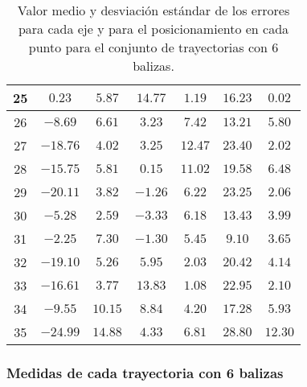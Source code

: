 \begin{table}[H]
\begin{tabular}{|c|c|c|c|c|c|c|}
                        25  & $0.23$    &  $5.87$   &  $14.77$   &  $1.19$   & $16.23$  &  $0.02$   \\ \hline
                        26  & $-8.69$   &  $6.61$   &  $3.23$    &  $7.42$   & $13.21$  &  $5.80$   \\ \hline
                        27  & $-18.76$  &  $4.02$   &  $3.25$    &  $12.47$  & $23.40$  &  $2.02$   \\ \hline
                        28  & $-15.75$  &  $5.81$   &  $0.15$    &  $11.02$  & $19.58$  &  $6.48$   \\ \hline
                        29  & $-20.11$  &  $3.82$   &  $-1.26$   &  $6.22$   & $23.25$  &  $2.06$   \\ \hline
                        30  & $-5.28$   &  $2.59$   &  $-3.33$   &  $6.18$   & $13.43$  &  $3.99$   \\ \hline
                        31  & $-2.25$   &  $7.30$   &  $-1.30$   &  $5.45$   & $9.10$   &  $3.65$   \\ \hline
                        32  & $-19.10$  &  $5.26$   &  $5.95$    &  $2.03$   & $20.42$  &  $4.14$   \\ \hline
                        33  & $-16.61$  &  $3.77$   &  $13.83$   &  $1.08$   & $22.95$  &  $2.10$   \\ \hline
                        34  & $-9.55$   &  $10.15$  &  $8.84$    &  $4.20$   & $17.28$  &  $5.93$   \\ \hline
                        35  & $-24.99$  &  $14.88$  &  $4.33$    &  $6.81$   & $28.80$  &  $12.30$  \\ \hline
        \end{tabular}
    \caption{Valor medio y desviación estándar de los errores para cada eje y para el posicionamiento en cada punto para el conjunto de trayectorias con 6 balizas.}
    \label{tab:media_lab_6_total}
\end{table}

\newpage
\subsubsection*{Medidas de cada trayectoria con 6 balizas}

